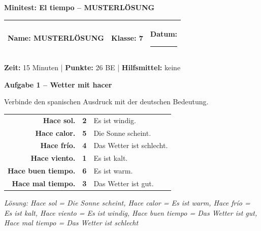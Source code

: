 \documentclass[11pt, a4paper]{article}
\newcommand{\fachfarbe}{spanisch}
\newcommand{\thema}{Minitest: El tiempo -- MUSTERLÖSUNG}
\newcommand{\klasse}{7}
\newcommand{\maxpunkte}{26}
\newcommand{\zeit}{15 Minuten}
\newcommand{\punktebox}[1]{\hfill\fbox{\small \_/#1}}
\newcommand{\luecke}[1]{\rule{#1}{0.4pt}}
\newcommand{\lsg}[1]{\textcolor{loesung}{\textbf{#1}}}
\newenvironment{aufgabe}[1]{%
    \needspace{5\baselineskip}%
    \nopagebreak[4]%
    \vspace{10pt}
    \noindent\textbf{\textcolor{\fachfarbe}{Aufgabe #1}}
    \nopagebreak[4]%
    \vspace{5pt}
    \nopagebreak[4]%
    \begin{list}{}{\leftmargin=0pt}
    \item[]
}{%
    \end{list}
}
\newcommand{\es}[1]{\textcolor{\fachfarbe}{\textbf{#1}}}
\begin{document}

\begin{center}
    {\Large\bfseries\textcolor{\fachfarbe}{\thema}}
\end{center}

\vspace{5pt}

\noindent
\begin{tabularx}{\textwidth}{|X|X|X|}
\hline
\textbf{Name:} \lsg{MUSTERLÖSUNG} &
\textbf{Klasse:} \klasse &
\textbf{Datum:} \luecke{2cm} \\
\hline
\end{tabularx}

\vspace{10pt}

\begin{infobox}
\textbf{Zeit:} \zeit{} | \textbf{Punkte:} \maxpunkte{} BE | \textbf{Hilfsmittel:} keine
\end{infobox}

\vspace{15pt}


\begin{aufgabe}{1 -- Wetter mit \es{hacer}}
Verbinde den spanischen Ausdruck mit der deutschen Bedeutung. \punktebox{6}
\end{aufgabe}

\begin{center}
\begin{tabular}{rcl}
\es{Hace sol.} & \lsg{2} & Es ist windig. \\[0.8em]
\es{Hace calor.} & \lsg{5} & Die Sonne scheint. \\[0.8em]
\es{Hace frío.} & \lsg{4} & Das Wetter ist schlecht. \\[0.8em]
\es{Hace viento.} & \lsg{1} & Es ist kalt. \\[0.8em]
\es{Hace buen tiempo.} & \lsg{6} & Es ist warm. \\[0.8em]
\es{Hace mal tiempo.} & \lsg{3} & Das Wetter ist gut. \\
\end{tabular}
\end{center}

\textit{Lösung: Hace sol = Die Sonne scheint, Hace calor = Es ist warm, Hace frío = Es ist kalt, Hace viento = Es ist windig, Hace buen tiempo = Das Wetter ist gut, Hace mal tiempo = Das Wetter ist schlecht}
\end{document}
